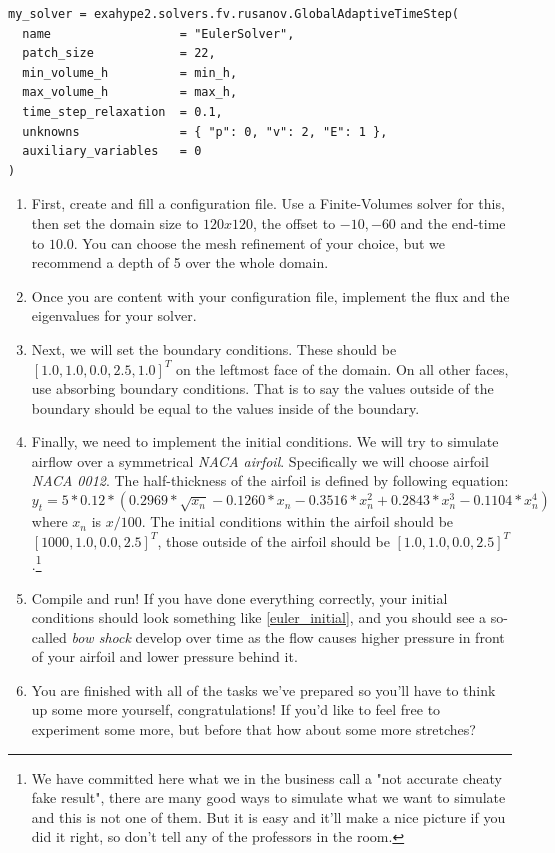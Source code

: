 \documentclass[12pt,letterpaper]{article}
\begin{document}
\begin{lstlisting}[style = Python]
my_solver = exahype2.solvers.fv.rusanov.GlobalAdaptiveTimeStep(
  name                  = "EulerSolver",
  patch_size            = 22,
  min_volume_h          = min_h,
  max_volume_h          = max_h,
  time_step_relaxation  = 0.1,
  unknowns              = { "p": 0, "v": 2, "E": 1 },
  auxiliary_variables   = 0
)
\end{lstlisting}

\begin{enumerate}
    \item
        First, create and fill a configuration file. Use a Finite-Volumes solver for this, then set the domain size to $120x120$,
        the offset to $-10, -60$ and the end-time to $10.0$.
        You can choose the mesh refinement of your choice, but we recommend a depth of 5 over the whole domain.
    \item
        Once you are content with your configuration file, implement the flux and the eigenvalues for your solver.
    \item
        Next, we will set the boundary conditions. These should be $[1.0, 1.0, 0.0, 2.5, 1.0]^T$ on the leftmost face of the domain.
        On all other faces, use absorbing boundary conditions.
        That is to say the values outside of the boundary should be equal to the values inside of the boundary.
    \item
        Finally, we need to implement the initial conditions.
        We will try to simulate airflow over a symmetrical \textit{NACA airfoil}.
        Specifically we will choose airfoil \textit{NACA 0012}.
        The half-thickness of the airfoil is defined by following equation:
        \begin{equation}
            y_t = 5*0.12* ( 0.2969*\sqrt{x_n} - 0.1260*x_n - 0.3516*x_n^2 + 0.2843*x_n^3 - 0.1104*x_n^4 )
        \end{equation}
        where $x_n$ is $x/100$.
        The initial conditions within the airfoil should be $[1000, 1.0, 0.0, 2.5]^T$,
        those outside of the airfoil should be $[1.0, 1.0, 0.0, 2.5]^T$.\footnote{We have committed here what we in the business call a "not accurate cheaty fake result", there are many good ways to simulate what we want to simulate and this is not one of them. But it is easy and it'll make a nice picture if you did it right, so don't tell any of the professors in the room.}

    \item
        Compile and run! If you have done everything correctly, your initial conditions should look something like \ref{euler_initial},
        and you should see a so-called \textit{bow shock} develop over time as the flow causes higher pressure in front of your airfoil and lower pressure behind it.

    \item
        You are finished with all of the tasks we've prepared so you'll have to think up some more yourself, congratulations!
        If you'd like to feel free to experiment some more, but before that how about some more stretches?
\end{enumerate}
\end{document}
